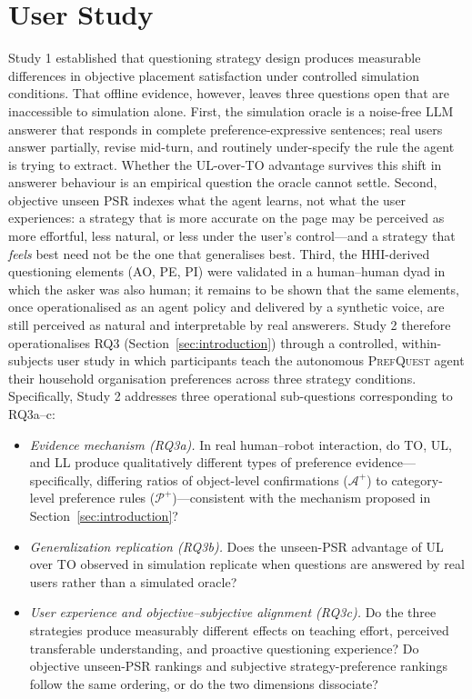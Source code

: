 \documentclass[manuscript,review,anonymous]{acmart}
\begin{document}
\section{User Study}
\label{sec:study2}

Study 1 established that questioning strategy design produces measurable differences in objective placement satisfaction under controlled simulation conditions. That offline evidence, however, leaves three questions open that are inaccessible to simulation alone. First, the simulation oracle is a noise-free LLM answerer that responds in complete preference-expressive sentences; real users answer partially, revise mid-turn, and routinely under-specify the rule the agent is trying to extract. Whether the UL-over-TO advantage survives this shift in answerer behaviour is an empirical question the oracle cannot settle. Second, objective unseen PSR indexes what the agent learns, not what the user experiences: a strategy that is more accurate on the page may be perceived as more effortful, less natural, or less under the user's control---and a strategy that \textit{feels} best need not be the one that generalises best. Third, the HHI-derived questioning elements (AO, PE, PI) were validated in a human--human dyad in which the asker was also human; it remains to be shown that the same elements, once operationalised as an agent policy and delivered by a synthetic voice, are still perceived as natural and interpretable by real answerers. Study 2 therefore operationalises RQ3 (Section~\ref{sec:introduction}) through a controlled, within-subjects user study in which participants teach the autonomous \textsc{PrefQuest} agent their household organisation preferences across three strategy conditions. Specifically, Study 2 addresses three operational sub-questions corresponding to RQ3a--c:

\begin{itemize}[leftmargin=*]
  \item \textit{Evidence mechanism (RQ3a).} In real human--robot interaction, do TO, UL, and LL produce qualitatively different types of preference evidence---specifically, differing ratios of object-level confirmations ($\mathcal{A}^+$) to category-level preference rules ($\mathcal{P}^+$)---consistent with the mechanism proposed in Section~\ref{sec:introduction}?
  \item \textit{Generalization replication (RQ3b).} Does the unseen-PSR advantage of UL over TO observed in simulation replicate when questions are answered by real users rather than a simulated oracle?
  \item \textit{User experience and objective--subjective alignment (RQ3c).} Do the three strategies produce measurably different effects on teaching effort, perceived transferable understanding, and proactive questioning experience? Do objective unseen-PSR rankings and subjective strategy-preference rankings follow the same ordering, or do the two dimensions dissociate?
\end{itemize}
\end{document}
